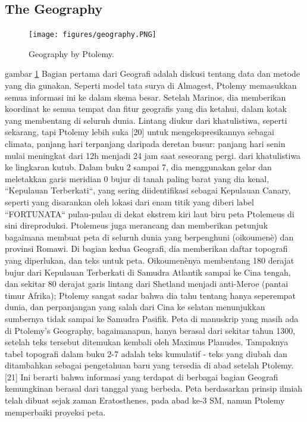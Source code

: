   \subsection{The Geography}	
   \begin{figure} [ht]
	\centerline{\texttt{[image: figures/geography.PNG]}}
	\caption{Geography by Ptolemy.}
	\label{geography}
		\end{figure}
    gambar \ref {geography} Bagian pertama dari Geografi adalah diskusi tentang data dan metode yang dia gunakan. 
    Seperti model tata surya di Almagest, Ptolemy memasukkan semua informasi ini ke dalam skema besar. Setelah Marinos, 
    dia memberikan koordinat ke semua tempat dan fitur geografis yang dia ketahui, dalam kotak yang membentang di seluruh dunia.
    Lintang diukur dari khatulistiwa, seperti sekarang, tapi Ptolemy lebih suka [20] untuk mengekspresikannya sebagai climata, 
    panjang hari terpanjang daripada deretan busur: panjang hari senin mulai meningkat dari 12h menjadi 24 jam saat seseorang pergi.
    dari khatulistiwa ke lingkaran kutub. Dalam buku 2 sampai 7, dia menggunakan gelar dan meletakkan garis meridian 0 bujur 
    di tanah paling barat yang dia kenal, ``Kepulauan Terberkati``, yang sering diidentifikasi sebagai Kepulauan Canary, 
    seperti yang disarankan oleh lokasi dari enam titik yang diberi label ``FORTUNATA`` pulau-pulau di dekat ekstrem kiri laut biru peta
    Ptolemeus di sini direproduksi.
	Ptolemeus juga merancang dan memberikan petunjuk bagaimana membuat peta di seluruh dunia yang berpenghuni (oikoumenè) dan provinsi
  Romawi. Di bagian kedua Geografi, dia memberikan daftar topografi yang diperlukan, dan teks untuk peta. Oikoumenènya membentang
  180 derajat bujur dari Kepulauan Terberkati di Samudra Atlantik sampai ke Cina tengah, dan sekitar 80 derajat garis lintang dari
  Shetland menjadi anti-Meroe (pantai timur Afrika); Ptolemy sangat sadar bahwa dia tahu tentang hanya seperempat dunia, 
  dan perpanjangan yang salah dari Cina ke selatan menunjukkan sumbernya tidak sampai ke Samudra Pasifik.
	Peta di manuskrip yang masih ada di Ptolemy's Geography, bagaimanapun, hanya berasal dari sekitar tahun 1300, setelah teks tersebut 
  ditemukan kembali oleh Maximus Planudes. Tampaknya tabel topografi dalam buku 2-7 adalah teks kumulatif - teks yang diubah dan 
  ditambahkan sebagai pengetahuan baru yang tersedia di abad setelah Ptolemy. [21] Ini berarti bahwa informasi yang terdapat 
  di berbagai bagian Geografi kemungkinan berasal dari tanggal yang berbeda. 
	Peta berdasarkan prinsip ilmiah telah dibuat sejak zaman Eratosthenes, pada abad ke-3 SM, namun Ptolemy memperbaiki proyeksi peta. 
